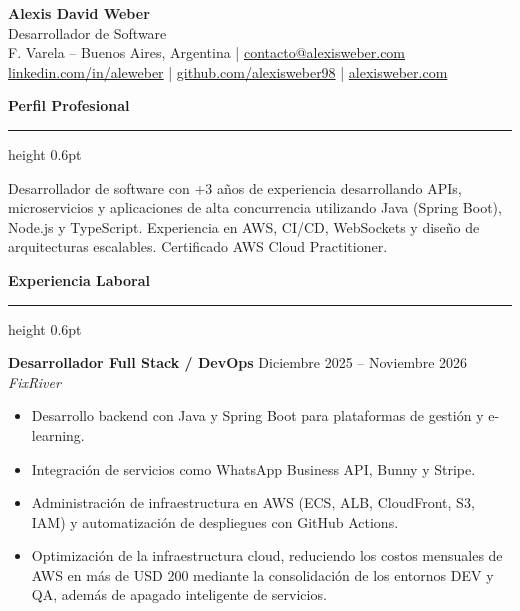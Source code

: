 \documentclass[10pt,a4paper]{article}
\renewcommand{\section}[2]{%
  \par\vspace{7pt}%
  {\large\bfseries\color{accent}#2}\par\vspace{1pt}%
  {\color{accent}\hrule height 0.6pt}\vspace{4pt}%
}
\newcommand{\job}[3]{%
  \textbf{#1} \hfill {\small #3}\\
  \textit{#2}%
}
\begin{document}
\begin{center}
  {\LARGE\bfseries Alexis David Weber}\\[3pt]
  {\large Desarrollador de Software}\\[6pt]
  {\small
    F. Varela -- Buenos Aires, Argentina \quad|\quad
    \href{mailto:contacto@alexisweber.com}{contacto@alexisweber.com}\\[2pt]
    \href{https://linkedin.com/in/aleweber}{linkedin.com/in/aleweber} \quad|\quad
    \href{https://github.com/alexisweber98}{github.com/alexisweber98} \quad|\quad
    \href{https://alexisweber.com}{alexisweber.com}
  }
\end{center}

\section*{Perfil Profesional}
Desarrollador de software con +3 años de experiencia desarrollando APIs,
microservicios y aplicaciones de alta concurrencia utilizando Java (Spring Boot),
Node.js y TypeScript. Experiencia en AWS, CI/CD, WebSockets y diseño de
arquitecturas escalables. Certificado AWS Cloud Practitioner.

\section*{Experiencia Laboral}

\job{Desarrollador Full Stack / DevOps}{FixRiver}{Diciembre 2025 -- Noviembre 2026}
\begin{itemize}
  \item Desarrollo backend con Java y Spring Boot para plataformas de gestión y e-learning.
  \item Integración de servicios como WhatsApp Business API, Bunny y Stripe.
  \item Administración de infraestructura en AWS (ECS, ALB, CloudFront, S3, IAM) y
        automatización de despliegues con GitHub Actions.
  \item Optimización de la infraestructura cloud, reduciendo los costos mensuales de AWS
        en más de USD 200 mediante la consolidación de los entornos DEV y QA, además de
        apagado inteligente de servicios.
\end{itemize}
\end{document}
